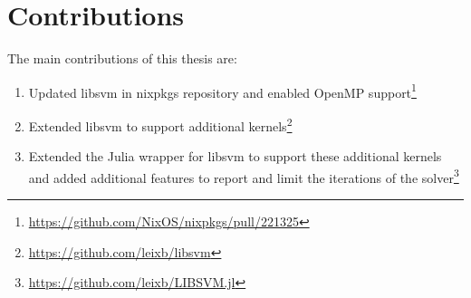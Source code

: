 




\section{Contributions}

The main contributions of this thesis are:
\begin{enumerate}
    \item Updated libsvm in nixpkgs repository and enabled OpenMP support\footnote{\url{https://github.com/NixOS/nixpkgs/pull/221325}}
    \item Extended libsvm to support additional kernels\footnote{\url{https://github.com/leixb/libsvm}}
    \item Extended the Julia wrapper for libsvm to support these additional kernels and added additional
          features to report and limit the iterations of the solver\footnote{\url{https://github.com/leixb/LIBSVM.jl}}
\end{enumerate}
